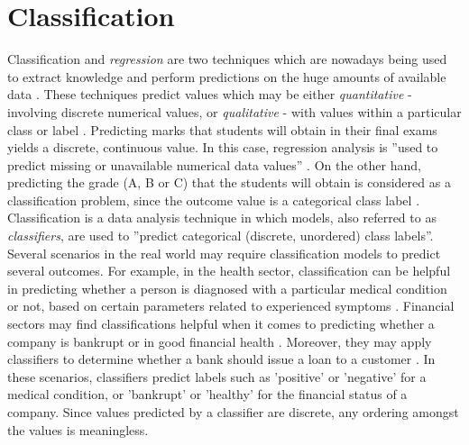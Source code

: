 \chapter[Classification]{Classification}
\label{ch:classification}

Classification and \textit{regression} are two techniques which are nowadays being used to extract knowledge and perform predictions on the huge amounts of available data \citep{sagar2017}. These techniques predict values which may be either \textit{quantitative} - involving discrete numerical values, or \textit{qualitative} - with values within a particular class or label \citep{james2006}. Predicting marks that students will obtain in their final exams yields a discrete, continuous value. In this case, regression analysis is ''used to predict missing or unavailable numerical data values'' \citep{jiawei2011}. On the other hand, predicting the grade (A, B or C) that the students will obtain is considered as a classification problem, since the outcome value is a categorical class label \citep{jiawei2011}.\\

Classification is a data analysis technique in which models, also referred to as \textit{classifiers}, are used to ''predict categorical (discrete, unordered) class labels''. Several scenarios in the real world may require classification models to predict several outcomes. For example, in the health sector, classification can be helpful in predicting whether a person is diagnosed with a particular medical condition or not, based on certain parameters related to experienced symptoms \citep{venkata2011,alzahani2015}. Financial sectors may find classifications helpful when it comes to predicting whether a company is bankrupt or in good financial health \citep{moradi2012}. Moreover, they may apply classifiers to determine whether a bank should issue a loan to a customer \citep{thomas2000}. In these scenarios, classifiers predict labels such as 'positive' or 'negative' for a medical condition, or 'bankrupt' or 'healthy' for the financial status of a company. Since values predicted by a classifier are discrete, any ordering amongst the values is meaningless. 

